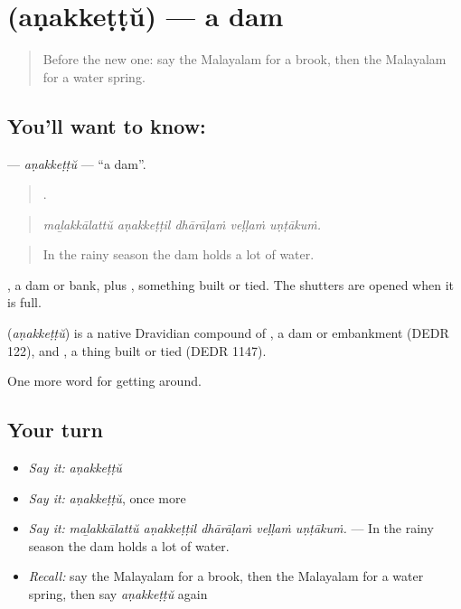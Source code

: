 \section[\texorpdfstring{\ml{അണക്കെട്ട്} (aṇakkeṭṭŭ)}{അണക്കെട്ട് (aṇakkeṭṭŭ)}]{ (aṇakkeṭṭŭ) — a dam}

\label{lesson:ML-C496-anakkettu}



\begin{quote}
Before the new one: say the Malayalam for a brook, then the Malayalam for a water spring.
\end{quote}

\subsection*{You'll want to know: }
\textbf{} — \emph{aṇakkeṭṭŭ} — \textquotedblleft{}a dam\textquotedblright{}.

\begin{quote}
    .
\end{quote}

\begin{quote}
\emph{maḻakkālattŭ aṇakkeṭṭil dhārāḷaṁ veḷḷaṁ uṇṭākuṁ.}
\end{quote}

\begin{quote}
In the rainy season the dam holds a lot of water.
\end{quote}

, a dam or bank, plus , something built or tied. The shutters are opened when it is full.

\begin{cousinweb}
\textbf{} (\emph{aṇakkeṭṭŭ}) is a native Dravidian compound of , a dam or embankment (DEDR 122), and , a thing built or tied (DEDR 1147).
\end{cousinweb}

\begin{grammarlens}[title={What you've built}]
One more word for getting around.
\end{grammarlens}

\subsection*{Your turn}
\begin{itemize}
\raggedright
  \item \emph{Say it:} \emph{aṇakkeṭṭŭ}
  \item \emph{Say it:} \emph{aṇakkeṭṭŭ}, once more
  \item \emph{Say it:} \emph{maḻakkālattŭ aṇakkeṭṭil dhārāḷaṁ veḷḷaṁ uṇṭākuṁ.} — In the rainy season the dam holds a lot of water.
  \item \emph{Recall:} say the Malayalam for a brook, then the Malayalam for a water spring, then say \emph{aṇakkeṭṭŭ} again
\end{itemize}

